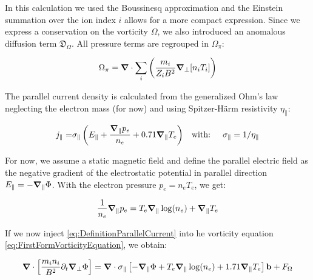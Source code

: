 In this calculation we used the Boussinesq approximation and the Einstein summation over the ion index $i$ allows for a more compact expression. Since we express a conservation on the vorticity $\Omega$, we also introduced an anomalous diffusion term $\mathfrak{D}_\Omega$. All pressure terms are regrouped in $\Omega_\pi$:

\begin{equation}
	\Omega_\pi = \grad\cdot\sum_{i}\left(\frac{m_i}{Z_i B^2}\grad_\perp[n_i T_i]\right)
\end{equation}


The parallel current density is calculated from the generalized Ohm's law neglecting the electron mass (for now) and using Spitzer-Härm resistivity $\eta_\parallel$:
 
\begin{align} 
 	\label{eq:DefinitionParallelCurrent}
 	j_\parallel =& \sigma_\parallel \left(E_\parallel + \frac{\grad_\parallel p_e}{n_e} + 0.71\grad_\parallel T_e\right) & \text{with: }&& \sigma_\parallel = 1/\eta_\parallel
 \end{align}

For now, we assume a static magnetic field and define the parallel electric field as the negative gradient of the electrostatic potential in parallel direction $E_\parallel=-\grad_\parallel\Phi$. With the electron pressure $p_e=n_eT_e$, we get:  
 
$$\frac{1}{n_e}\grad_\parallel p_e = T_e\grad_\parallel\log(n_e) + \grad_\parallel T_e$$

If we now inject \autoref{eq:DefinitionParallelCurrent} into he vorticity equation \autoref{eq:FirstFormVorticityEquation}, we obtain: 
 
\begin{equation}
	\label{eq:S3X_ElectrostaticVorticityEquation}
	 \grad\cdot\left[\frac{m_i n_i}{ B^2}\partial_t\grad_\perp\Phi\right]  = \grad\cdot\sigma_\parallel \left[-\grad_\parallel\Phi +  T_e\grad_\parallel\log(n_e) + 1.71\grad_\parallel T_e\right]\mathbf{b} + F_\Omega
\end{equation}

